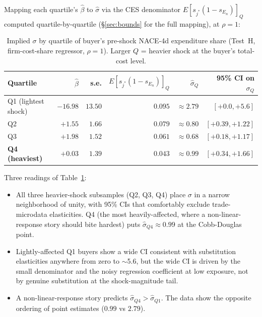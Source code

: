 Mapping each quartile's $\widehat{\beta}$ to $\widehat{\sigma}$ via the CES denominator $E[s_{j^*}(1 - s_{E_n})]_Q$ computed quartile-by-quartile (\S\ref{sec:bounds} for the full mapping), at $\rho = 1$:

\begin{table}[H]
    \centering
    \caption{Implied $\sigma$ by quartile of buyer's pre-shock NACE-4d expenditure share (Test~H, firm-cost-share regressor, $\rho = 1$). Larger $Q$ = heavier shock at the buyer's total-cost level.}
    \label{tab:sigma_by_shock_quartile}
    \footnotesize
    \begin{tabular}{lrrrrr}
        \toprule
        Quartile & $\widehat{\beta}$ & s.e. & $E[s_{j^*}(1-s_{E_n})]_Q$ & $\widehat{\sigma}_Q$ & 95\% CI on $\sigma_Q$ \\
        \midrule
        Q1 (lightest shock)     & $-16.98$ & $13.50$ & $0.095$ & $\approx 2.79$ & $[+0.0, +5.6]$ \\
        Q2                      & $+1.55$  & $1.66$  & $0.079$ & $\approx 0.80$ & $[+0.39, +1.22]$ \\
        Q3                      & $+1.98$  & $1.52$  & $0.061$ & $\approx 0.68$ & $[+0.18, +1.17]$ \\
        \textbf{Q4 (heaviest)}  & $+0.03$  & $1.39$  & $0.043$ & $\approx 0.99$ & $[+0.34, +1.66]$ \\
        \bottomrule
    \end{tabular}
\end{table}

Three readings of Table~\ref{tab:sigma_by_shock_quartile}:
\begin{itemize}
    \item All three heavier-shock subsamples (Q2, Q3, Q4) place $\sigma$ in a narrow neighborhood of unity, with 95\% CIs that comfortably exclude trade-microdata elasticities. Q4 (the most heavily-affected, where a non-linear-response story should bite hardest) puts $\widehat{\sigma}_{Q4} \approx 0.99$ at the Cobb-Douglas point.
    \item Lightly-affected Q1 buyers show a wide CI consistent with substitution elasticities anywhere from zero to $\sim$5.6, but the wide CI is driven by the small denominator and the noisy regression coefficient at low exposure, not by genuine substitution at the shock-magnitude tail.
    \item A non-linear-response story predicts $\widehat{\sigma}_{Q4} > \widehat{\sigma}_{Q1}$. The data show the opposite ordering of point estimates ($0.99$ vs $2.79$).
\end{itemize}

